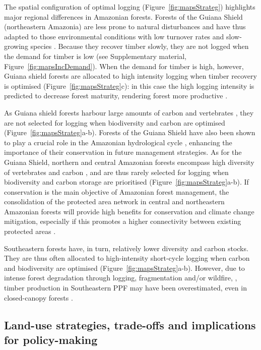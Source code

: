 \documentclass{article}
\begin{document}
The spatial configuration of optimal logging (Figure~\ref{fig:mapsStrateg}) highlights major regional differences in Amazonian forests. Forests of the Guiana Shield (northeastern Amazonia) are less prone to natural disturbances \cite{Espirito-Santo2014} and have thus adapted to those environmental conditions with low turnover rates and slow-growing species \cite{Johnson2016,Quesada2012}. 
Because they recover timber slowly, they are not logged when the demand for timber is low (see Supplementary material, Figure~\ref{fig:mapsIncDemand}). 
When the demand for timber is high, however, Guiana shield forests are allocated to high intensity logging when timber recovery is optimised (Figure~\ref{fig:mapsStrateg}c): in this case the high logging intensity is predicted to decrease forest maturity, rendering forest more productive \cite{Piponiot2018,Roedig2018,Perez-Espana1999}.

As Guiana shield forests harbour large amounts of carbon \cite{Avitabile2016} and vertebrates \cite{Jenkins2013}, they are not selected for logging when biodiversity and carbon are optimised (Figure~\ref{fig:mapsStrateg}a-b). 
Forests of the Guiana Shield have also been shown to play a crucial role in the Amazonian hydrological cycle \cite{Staal2018,Bovolo2018}, enhancing the importance of their conservation in future management strategies. 
As for the Guiana Shield, northern and central Amazonian forests encompass high diversity of vertebrates \cite{Jenkins2013} and carbon \cite{Avitabile2016}, and are thus rarely selected for logging when biodiversity and carbon storage are prioritised (Figure~\ref{fig:mapsStrateg}a-b). If conservation is the main objective of Amazonian forest management, the consolidation of the protected area network in central and northeastern Amazonian forests will provide high benefits for conservation and climate change mitigation, especially if this promotes a higher connectivity between existing protected areas \cite{Hansen2007}. 

Southeastern forests have, in turn, relatively lower diversity and carbon stocks. They are thus often allocated to high-intensity short-cycle logging when carbon and biodiversity are optimised (Figure~\ref{fig:mapsStrateg}a-b). 
However, due to intense forest degradation through logging, fragmentation and/or wildfire,  \cite{Foley2007,Davidson2012}, timber production in Southeastern PPF may have been overestimated, even in closed-canopy forests \cite{Asner2004}. 

\subsection{Land-use strategies, trade-offs and implications for policy-making}
\end{document}
